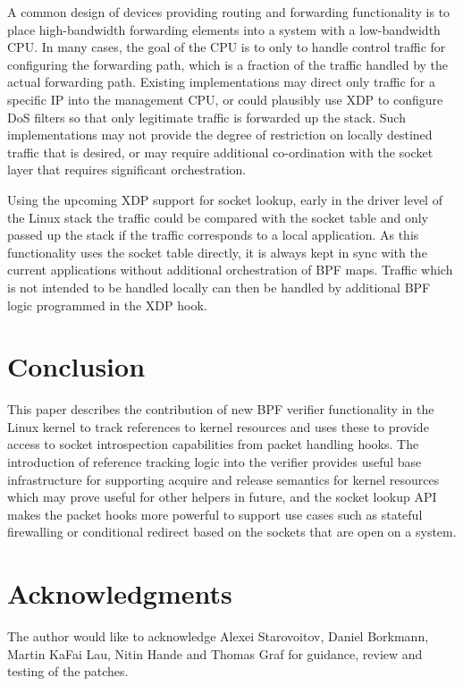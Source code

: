 \documentclass[10pt,sigconf,authorversion]{lpc}
\newcommand\todo[1]{\textcolor{red}{#1}}
\begin{document}
A common design of devices providing routing and forwarding functionality is to
place high-bandwidth forwarding elements into a system with a low-bandwidth
CPU. In many cases, the goal of the CPU is to only to handle control traffic
for configuring the forwarding path, which is a fraction of the traffic handled
by the actual forwarding path. Existing implementations may direct only traffic
for a specific IP into the management CPU, or could plausibly use XDP to
configure DoS filters so that only legitimate traffic is forwarded up the
stack. Such implementations may not provide the degree of restriction on
locally destined traffic that is desired, or may require additional
co-ordination with the socket layer that requires significant orchestration.

Using the upcoming XDP support for socket lookup, early in the driver level of
the Linux stack the traffic could be compared with the socket table and only
passed up the stack if the traffic corresponds to a local application. As this
functionality uses the socket table directly, it is always kept in sync with
the current applications without additional orchestration of BPF maps. Traffic
which is not intended to be handled locally can then be handled by additional
BPF logic programmed in the XDP hook.

\section{Conclusion}

This paper describes the contribution of new BPF verifier functionality in the
Linux kernel to track references to kernel resources and uses these to provide
access to socket introspection capabilities from packet handling hooks. The
introduction of reference tracking logic into the verifier provides
useful base infrastructure for supporting acquire and release semantics for
kernel resources which may prove useful for other helpers in future, and the
socket lookup API makes the packet hooks more powerful to support use cases
such as stateful firewalling or conditional redirect based on the sockets that
are open on a system.


\section{Acknowledgments}

The author would like to acknowledge Alexei Starovoitov, Daniel Borkmann,
Martin KaFai Lau, Nitin Hande and Thomas Graf for guidance, review and testing
of the patches.



\end{document}
